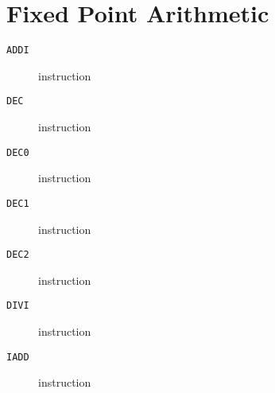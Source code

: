 \section{Fixed Point Arithmetic}
\begin{description}
\item[\texttt{ADDI}] instruction\\

\end{description}
\clearpage
\begin{description}
\item[\texttt{DEC}] instruction\\

\end{description}
\clearpage
\begin{description}
\item[\texttt{DEC0}] instruction\\

\end{description}
\clearpage
\begin{description}
\item[\texttt{DEC1}] instruction\\

\end{description}
\clearpage
\begin{description}
\item[\texttt{DEC2}] instruction\\

\end{description}
\clearpage
\begin{description}
\item[\texttt{DIVI}] instruction\\

\end{description}
\clearpage
\begin{description}
\item[\texttt{IADD}] instruction\\

\end{description}
